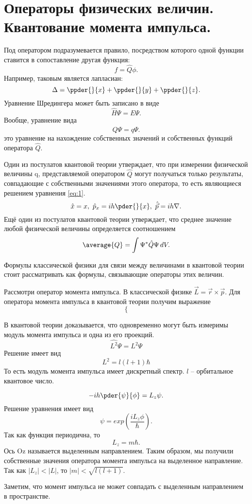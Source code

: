 \chapter{Операторы физических величин. Квантование момента импульса.}

Под оператором подразумевается правило, посредством которого одной функции
ставится в сопоставление другая функция:
\[
    f = \hat{Q}\phi.
\]
Например, таковым является лапласиан:
\[
    \Delta = \ppder{}{x} + \ppder{}{y} + \ppder{}{z}.
\]
Уравнение Шредингера может быть записано в виде
\[
    \hat{H}\Psi = E\Psi.
\]
Вообще, уравнение вида
\begin{equation}
    \hat{Q}\Psi = q\Psi.
    \label{eq:1}    
\end{equation}
это уравнение на нахождение собственных значений и собственных функций оператора
\( \hat{Q} \).

Один из постулатов квантовой теории утверждает, что при измерении физической
величины q, представляемой оператором  \( \hat{Q} \) могут получаться только
результаты, совпадающие с собственными значениями этого оператора, то есть
являющиеся решением уравнения \ref{eq:1}.
\[
    \hat{x} = x,\ \hat{p}_x = ih\pder{}{x},\ \hat{\vec{p}} = ih\nabla. 
\]
Ещё один из постулатов квантовой теории утверждает, что среднее значение любой
физической величины определяется соотношением
\[
    \average{Q} = \int \Psi^*\hat{Q}\Psi\,dV.
\]

Формулы классической физики для связи между величинами в квантовой теории стоит
рассматривать как формулы, связывающие операторы этих величин.

Рассмотри оператор момента импульса. В классической физике
\( \vec{L} = \vec{r}\times\vec{p} \). Для оператора момента импульса в квантовой
теории получим выражение
\[
    \left\{\right.
\]

В квантовой теории доказывается, что одновременно могут быть измеримы модуль
момента импульса и одна из его проекций.
\[
    \hat{L^2}\Psi = L^2\Psi
\]
Решение имеет вид
\[
    L^2 = l(l+1)\hbar
\]
То есть модуль момента импульса имеет дискретный спектр. \( l \) -- орбитальное
квантовое число.

\[
    -ih\pder{\psi}{\phi} = L_z\psi.
\]
Решение уравнения имеет вид
\[
    \psi = exp(\frac{iL_z\phi}{\hbar}).
\]
Так как функция периодична, то
\[
    L_z = m\hbar.
\]
Ось Oz  называется выделенным направлением. Таким образом, мы получили
собственные значения оператора момента импульса на выделенное направление.
Так как \( |L_z| < |L| \), то \( |m| < \sqrt{l(l+1)} \).

Заметим, что момент импульса не может совпадать с выделенным направлением в
пространстве.

\newpage
